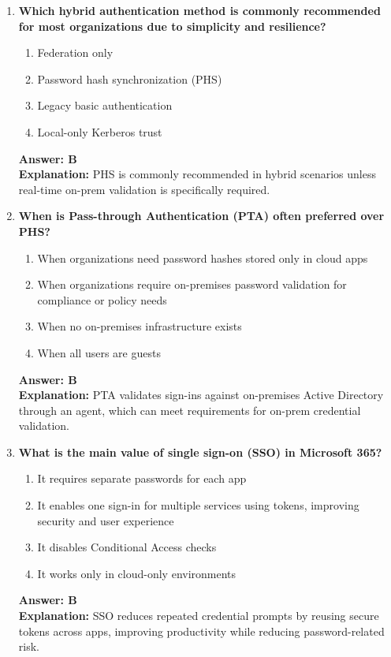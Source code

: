 \documentclass[10pt]{article}
\begin{document}
\begin{enumerate}[leftmargin=*]
\item \textbf{Which hybrid authentication method is commonly recommended for most organizations due to simplicity and resilience?}
\begin{enumerate}[label=\Alph*.]
  \item Federation only
  \item Password hash synchronization (PHS)
  \item Legacy basic authentication
  \item Local-only Kerberos trust
\end{enumerate}
\textbf{Answer: B}\\
\textbf{Explanation:} PHS is commonly recommended in hybrid scenarios unless real-time on-prem validation is specifically required.

\item \textbf{When is Pass-through Authentication (PTA) often preferred over PHS?}
\begin{enumerate}[label=\Alph*.]
  \item When organizations need password hashes stored only in cloud apps
  \item When organizations require on-premises password validation for compliance or policy needs
  \item When no on-premises infrastructure exists
  \item When all users are guests
\end{enumerate}
\textbf{Answer: B}\\
\textbf{Explanation:} PTA validates sign-ins against on-premises Active Directory through an agent, which can meet requirements for on-prem credential validation.

\item \textbf{What is the main value of single sign-on (SSO) in Microsoft 365?}
\begin{enumerate}[label=\Alph*.]
  \item It requires separate passwords for each app
  \item It enables one sign-in for multiple services using tokens, improving security and user experience
  \item It disables Conditional Access checks
  \item It works only in cloud-only environments
\end{enumerate}
\textbf{Answer: B}\\
\textbf{Explanation:} SSO reduces repeated credential prompts by reusing secure tokens across apps, improving productivity while reducing password-related risk.

\end{enumerate}
\clearpage
\end{document}
